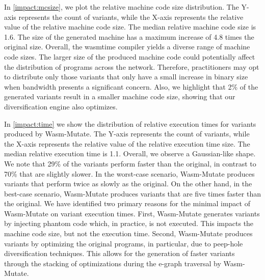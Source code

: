 \documentclass[a4paper,fleqn]{cas-dc}
\newcommand{\tool}{{\sc Wasm-Mutate}\xspace}
\newcommand{\Wasm}{WebAssembly\xspace}
\newenvironment{revision1}{\color{blue}}{}
\begin{document}
\begin{revision1}
In \autoref{impact:mcsize}, we plot the relative machine code size distribution.
The Y-axis represents the count of variants, while the X-axis represents the relative value of the relative machine code size.
The median relative machine code size is 1.6.
The size of the generated machine has a maximum increase of 4.8 times the original size.
Overall, the wasmtime compiler yields a diverse range of machine code sizes.
The larger size of the produced machine code could potentially affect the distribution of programs across the network.
Therefore, practitioners may opt to distribute only those variants that only have a small increase in binary size when bandwidth presents a significant concern.
Also, we highlight that 2\% of the generated variants result in a smaller machine code size, showing that our diversification engine also optimizes.


In \autoref{impact:time} we show the distribution of relative execution times for variants produced by \tool.
The Y-axis represents the count of variants, while the X-axis represents the relative value of the relative execution time size.
The median relative execution time is 1.1.
Overall, we observe a Gaussian-like shape.
We note that 29\% of the variants perform faster than the original, in contrast to 70\% that are slightly slower.
In the worst-case scenario, \tool produces variants that perform twice as slowly as the original.
On the other hand, in the best-case scenario, \tool produces variants that are five times faster than the original.
We have identified two primary reasons for the minimal impact of \tool on variant execution times.
First, \tool generates variants by injecting phantom code which, in practice, is not executed.
This impacts the machine code size, but not the execution time.
Second, \tool produces variants by optimizing the original programs, in particular, due to peep-hole diversification techniques.
This allows for the generation of faster variants through the stacking of optimizations during the e-graph traversal by \tool.



\end{revision1}
\end{document}
